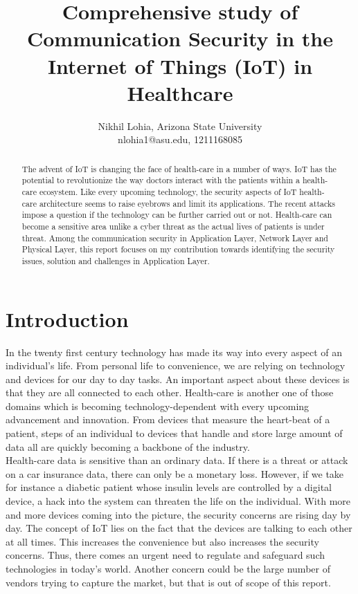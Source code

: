 \documentclass[letterpaper, 10 pt, conference]{ieeeconf}  %
\title{\LARGE \bf
Comprehensive study of Communication Security in the Internet of Things (IoT) in Healthcare
}
\author{Nikhil Lohia, Arizona State University\\nlohia1@asu.edu, 1211168085}
\begin{document}
\maketitle
\thispagestyle{empty}
\pagestyle{empty}


\begin{abstract}

The advent of IoT is changing the face of health-care in a number of ways. IoT has the potential to revolutionize the way doctors interact with the patients within a health-care ecosystem. Like every upcoming technology, the security aspects of IoT health-care architecture seems to raise eyebrows and limit its applications. The recent attacks impose a question if the technology can be further carried out or not. Health-care can become a sensitive area unlike a cyber threat as the actual lives of patients is under threat. Among the communication security in Application Layer, Network Layer and Physical Layer, this report focuses on my contribution towards identifying the security issues, solution and challenges in Application Layer.
\end{abstract}


\section{Introduction}

In the twenty first century technology has made its way into every aspect of an individual's life. From personal life to convenience, we are relying on technology and devices for our day to day tasks. An important aspect about these devices is that they are all connected to each other. Health-care is another one of those domains which is becoming technology-dependent with every upcoming advancement and innovation. From devices that measure the heart-beat of a patient, steps of an individual to devices that handle and store large amount of data all are quickly becoming a backbone of the industry.\\

\indent Health-care data is sensitive than an ordinary data. If there is a threat or attack on a car insurance data, there can only be a monetary loss. However, if we take for instance a diabetic patient whose insulin levels are controlled by a digital device, a hack into the system can threaten the life on the individual. With more and more devices coming into the picture, the security concerns are rising day by day. The concept of IoT lies on the fact that the devices are talking to each other at all times. This increases the convenience but also increases the security concerns. Thus, there comes an urgent need to regulate and safeguard such technologies in today's world. Another concern could be the large number of vendors trying to capture the market, but that is out of scope of this report. \\
\end{document}
